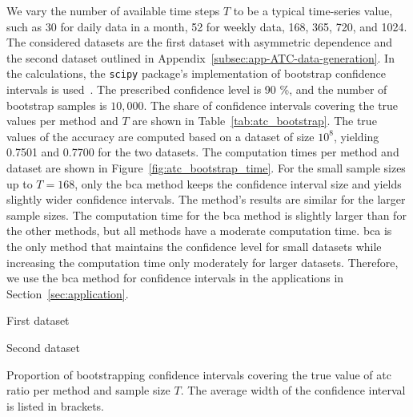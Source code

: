 \documentclass[pdflatex]{sn-jnl}
\theoremstyle{plain}%
\theoremstyle{definition}
\begin{document}
We vary the number of available time steps $T$ to be a typical time-series value, such as 30 for daily data in a month, 52 for weekly data, 168, 365, 720, and 1024.
The considered datasets are the first dataset with asymmetric dependence and the second dataset outlined in Appendix~\ref{subsec:app-ATC-data-generation}.
In the calculations, the \verb|scipy| package's implementation of bootstrap confidence intervals is used~\citep{Virtanen2020}.
The prescribed confidence level is 90 \%, and the number of bootstrap samples is $10,000$.
The share of confidence intervals covering the true values per method and $T$ are shown in Table~\ref{tab:atc_bootstrap}.
The true values of the accuracy are computed based on a dataset of size $10^8$, yielding 0.7501 and 0.7700 for the two datasets.
The computation times per method and dataset are shown in Figure~\ref{fig:atc_bootstrap_time}.
For the small sample sizes up to $T = 168$, only the \ac{bca} method keeps the confidence interval size and yields slightly wider confidence intervals.
The method's results are similar for the larger sample sizes.
The computation time for the \ac{bca} method is slightly larger than for the other methods, but all methods have a moderate computation time.
\Ac{bca} is the only method that maintains the confidence level for small datasets while increasing the computation time only moderately for larger datasets.
Therefore, we use the \ac{bca} method for confidence intervals in the applications in Section~\ref{sec:application}.


\begin{table}
    \centering
    \tiny
    \begin{subtable}{.48\textwidth}
       \centering
        
        \caption{First dataset}
    \end{subtable}\hspace{0.02\textwidth}
    \begin{subtable}{.48\textwidth}
       \centering
       
        \caption{Second dataset}
    \end{subtable}
    \caption[Proportion of bootstrapping confidence intervals covering the true value of \ac{atc} ratio per method and sample size $T$ in the bootstrap simulation study.]{Proportion of bootstrapping confidence intervals covering the true value of \ac{atc} ratio per method and sample size $T$. The average width of the confidence interval is listed in brackets.}
    \label{tab:atc_bootstrap}
\end{table}
\end{document}
